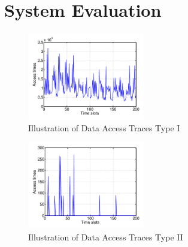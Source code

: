 \section{System Evaluation}
\label{sec:evaluation}

\begin{figure}[!t]
\centering
\includegraphics[width=2.0in]{./datafig1.pdf}
\caption{Illustration of Data Access Traces Type I}
\vspace{-0.1in}
\label{datafig1}
\end{figure}

\begin{figure}[!t]
\centering
\includegraphics[width=2.0in]{./datafig2.pdf}
\caption{Illustration of Data Access Traces Type II}
\vspace{-0.25in}
\label{datafig2}
\end{figure}


